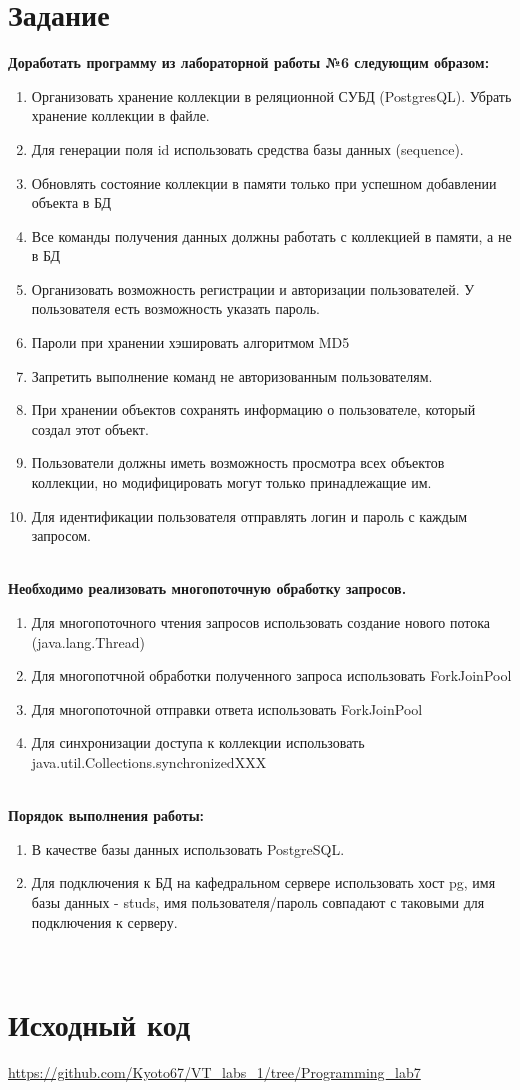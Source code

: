

\section{Задание}
\textbf{Доработать программу из лабораторной работы №6 следующим образом:}
\begin{enumerate}
    \item Организовать хранение коллекции в реляционной СУБД (PostgresQL). Убрать хранение коллекции в файле.
    \item Для генерации поля id использовать средства базы данных (sequence).
    \item Обновлять состояние коллекции в памяти только при успешном добавлении объекта в БД
    \item Все команды получения данных должны работать с коллекцией в памяти, а не в БД
    \item Организовать возможность регистрации и авторизации пользователей. У пользователя есть возможность указать пароль.
    \item Пароли при хранении хэшировать алгоритмом MD5
    \item Запретить выполнение команд не авторизованным пользователям.
    \item При хранении объектов сохранять информацию о пользователе, который создал этот объект.
    \item Пользователи должны иметь возможность просмотра всех объектов коллекции, но модифицировать могут только принадлежащие им.
    \item Для идентификации пользователя отправлять логин и пароль с каждым запросом.
\end{enumerate}
\\
\textbf{Необходимо реализовать многопоточную обработку запросов.}
\begin{enumerate}
    \item Для многопоточного чтения запросов использовать создание нового потока (java.lang.Thread)
    \item Для многопотчной обработки полученного запроса использовать ForkJoinPool
    \item Для многопоточной отправки ответа использовать ForkJoinPool
    \item Для синхронизации доступа к коллекции использовать java.util.Collections.synchronizedXXX
\end{enumerate}
\\
\textbf{Порядок выполнения работы:}
\begin{enumerate}
    \item В качестве базы данных использовать PostgreSQL.
    \item Для подключения к БД на кафедральном сервере использовать хост pg, имя базы данных - studs, имя пользователя/пароль совпадают с таковыми для подключения к серверу.
\end{enumerate}
\\
\section{Исходный код}
\url{https://github.com/Kyoto67/VT_labs_1/tree/Programming_lab7}